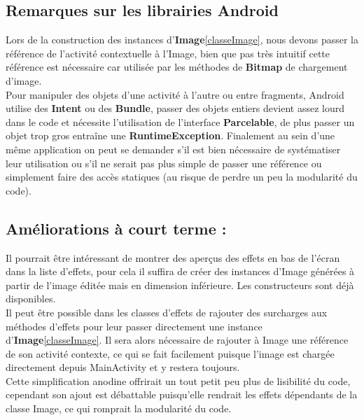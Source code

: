 \subsection{Remarques sur les librairies Android}
Lors de la construction des instances d'\textbf{Image}\ref{classeImage}, nous devons passer la référence de l'activité contextuelle à l'Image, bien que pas très intuitif cette référence est nécessaire car utilisée par les méthodes de \textbf{Bitmap} de chargement d'image.
\\

\label{parcelable}
Pour manipuler des objets d'une activité à l'autre ou entre fragments, Android utilise des \textbf{Intent} ou des \textbf{Bundle}, passer des objets entiers devient assez lourd dans le code et nécessite l'utilisation de l'interface \textbf{Parcelable}, de plus passer un objet trop gros entraîne une \textbf{RuntimeException}. Finalement au sein d'une même application on peut se demander s'il est bien nécessaire de systématiser leur utilisation ou s'il ne serait pas plus simple de passer une référence ou simplement faire des accès statiques (au risque de perdre un peu la modularité du code).

\subsection{Améliorations à court terme :}
Il pourrait être intéressant de montrer des aperçus des effets en bas de l'écran dans la liste d'effets, pour cela il suffira de créer des instances d'Image générées à partir de l'image éditée mais en dimension inférieure. Les constructeurs sont déjà disponibles.
\\

Il peut être possible dans les classes d'effets de rajouter des surcharges aux méthodes d'effets pour leur passer directement une instance d'\textbf{Image}\ref{classeImage}. Il sera alors nécessaire de rajouter à Image une référence de son activité contexte, ce qui se fait facilement puisque l'image est chargée directement depuis MainActivity et y restera toujours.
\\
Cette simplification anodine offrirait un tout petit peu plus de lisibilité du code, cependant son ajout est débattable puisqu'elle rendrait les effets dépendants de la classe Image, ce qui romprait la modularité du code.
\\

